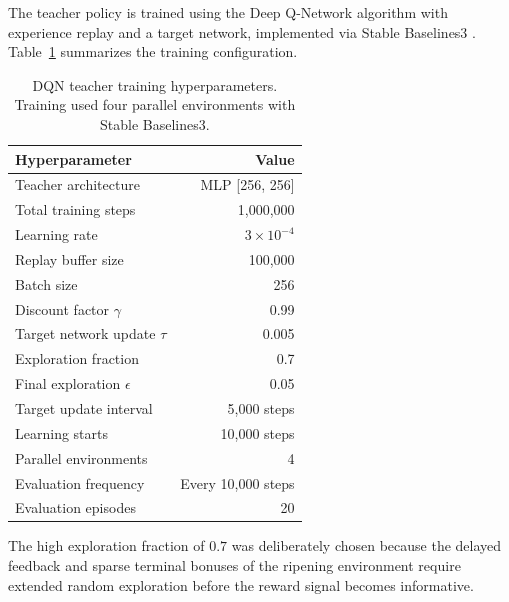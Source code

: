     The teacher policy is trained using the Deep Q-Network algorithm \citep{sutton2018, mnih2015dqn} with experience replay and a target network, implemented via Stable Baselines3 \citep{raffin2021sb3}. Table~\ref{tab:dqn_hyperparams} summarizes the training configuration.

    \begin{table}[ht]
        \caption{DQN teacher training hyperparameters. Training used four parallel environments with Stable Baselines3.}
        \label{tab:dqn_hyperparams}
        \centering
        \begin{tabular}{lr}
            \hline
            \textbf{Hyperparameter} & \textbf{Value} \\
            \hline
            Teacher architecture & MLP [256, 256] \\
            Total training steps & 1,000,000 \\
            Learning rate & $3 \times 10^{-4}$ \\
            Replay buffer size & 100,000 \\
            Batch size & 256 \\
            Discount factor $\gamma$ & 0.99 \\
            Target network update $\tau$ & 0.005 \\
            Exploration fraction & 0.7 \\
            Final exploration $\epsilon$ & 0.05 \\
            Target update interval & 5,000 steps \\
            Learning starts & 10,000 steps \\
            Parallel environments & 4 \\
            Evaluation frequency & Every 10,000 steps \\
            Evaluation episodes & 20 \\
            \hline
        \end{tabular}
    \end{table}

    The high exploration fraction of $0.7$ was deliberately chosen because the delayed feedback and sparse terminal bonuses of the ripening environment require extended random exploration before the reward signal becomes informative.



